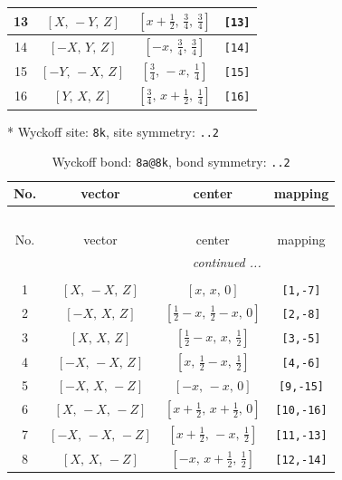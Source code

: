 \documentclass[fleqn,8pt]{jsarticle}
\begin{document}
\begin{longtable}{cccc}
13 & $\left[ X,\, - Y,\, Z \right]$ & $\left[ x + \frac{1}{2},\, \frac{3}{4},\, \frac{3}{4} \right]$ & {\tt [13]} \\ \hline
14 & $\left[ - X,\, Y,\, Z \right]$ & $\left[ - x,\, \frac{3}{4},\, \frac{3}{4} \right]$ & {\tt [14]} \\ \hline
15 & $\left[ - Y,\, - X,\, Z \right]$ & $\left[ \frac{3}{4},\, - x,\, \frac{1}{4} \right]$ & {\tt [15]} \\ \hline
16 & $\left[ Y,\, X,\, Z \right]$ & $\left[ \frac{3}{4},\, x + \frac{1}{2},\, \frac{1}{4} \right]$ & {\tt [16]} \\
\end{longtable}
* Wyckoff site: {\tt 8k}, site symmetry: {\tt ..2}
\renewcommand{\arraystretch}{1.2}
\begin{longtable}{cccc}
\caption{Wyckoff bond: {\tt 8a@8k}, bond symmetry: {\tt ..2}}
 \\
 \hline \hline
No. & vector & center & mapping \\ \hline \endfirsthead

\multicolumn{3}{l}{\tablename\ \thetable{}} \\
 \hline \hline
No. & vector & center & mapping \\ \hline \endhead

 \hline \hline
\multicolumn{3}{r}{\footnotesize\it continued ...} \\ \endfoot

 \hline \hline
\multicolumn{3}{r}{} \\ \endlastfoot

1 & $\left[ X,\, - X,\, Z \right]$ & $\left[ x,\, x,\, 0 \right]$ & {\tt [1,-7]} \\ \hline
2 & $\left[ - X,\, X,\, Z \right]$ & $\left[ \frac{1}{2} - x,\, \frac{1}{2} - x,\, 0 \right]$ & {\tt [2,-8]} \\ \hline
3 & $\left[ X,\, X,\, Z \right]$ & $\left[ \frac{1}{2} - x,\, x,\, \frac{1}{2} \right]$ & {\tt [3,-5]} \\ \hline
4 & $\left[ - X,\, - X,\, Z \right]$ & $\left[ x,\, \frac{1}{2} - x,\, \frac{1}{2} \right]$ & {\tt [4,-6]} \\ \hline
5 & $\left[ - X,\, X,\, - Z \right]$ & $\left[ - x,\, - x,\, 0 \right]$ & {\tt [9,-15]} \\ \hline
6 & $\left[ X,\, - X,\, - Z \right]$ & $\left[ x + \frac{1}{2},\, x + \frac{1}{2},\, 0 \right]$ & {\tt [10,-16]} \\ \hline
7 & $\left[ - X,\, - X,\, - Z \right]$ & $\left[ x + \frac{1}{2},\, - x,\, \frac{1}{2} \right]$ & {\tt [11,-13]} \\ \hline
8 & $\left[ X,\, X,\, - Z \right]$ & $\left[ - x,\, x + \frac{1}{2},\, \frac{1}{2} \right]$ & {\tt [12,-14]} \\
\end{longtable}
\end{document}
